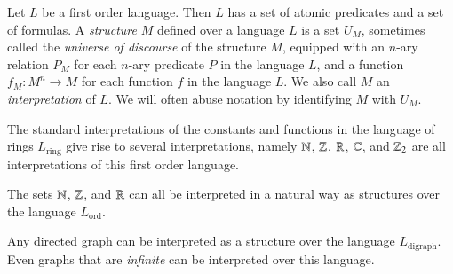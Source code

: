 Let $L$ be a first order language. Then $L$ has a set of atomic predicates and a set of formulas. A \emph{structure} $M$ defined over a language $L$ is a set $U_M$, sometimes called the \emph{universe of discourse} of the structure $M$, equipped with an $n$-ary relation $P_M$ for each $n$-ary predicate $P$ in the language $L$, and a function $f_M: M^n \to M$ for each function $f$ in the language $L$. We also call $M$ an \emph{interpretation} of $L$. We will often abuse notation by identifying $M$ with $U_M$.

\begin{example}
    The standard interpretations of the constants and functions in the language of rings $L_{\text{ring}}$ give rise to several interpretations, namely $\operatorname{\mathbb{N}}$, $\operatorname{\mathbb{Z}}$, $\operatorname{\mathbb{R}}$, $\operatorname{\mathbb{C}}$, and $\operatorname{\mathbb{Z}}_2$ are all interpretations of this first order language.
\end{example}

\begin{example}
    The sets $\operatorname{\mathbb{N}}$, $\operatorname{\mathbb{Z}}$, and $\operatorname{\mathbb{R}}$ can all be interpreted in a natural way as structures over the language $L_{\text{ord}}$.
\end{example}

\begin{example}
    Any directed graph can be interpreted as a structure over the language $L_{\text{digraph}}$. Even graphs that are \emph{infinite} can be interpreted over this language.
\end{example}

